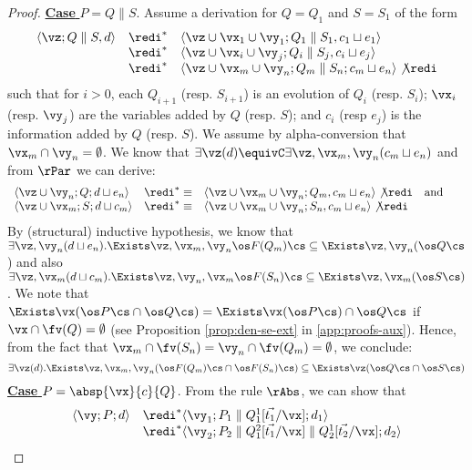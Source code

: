 \documentclass{tlp}
\begin{document}
\begin{proof}
	
\noindent \underline{{\bf Case}  $P=Q \parallel S$}.   Assume a derivation for $Q=Q_1$ and $S=S_1$ of the form
	\[
	\begin{array}{lll}
	\langle \vz ;Q\parallel S,d \rangle &\redi^*& 
	\langle \vz \cup \vx_1\cup\vy_1;Q_1\parallel S_1, c_1 \sqcup e_1 \rangle \\
	&\redi^*& \langle \vz \cup  \vx_i \cup \vy_j; Q_i \parallel S_j , c_i \sqcup e_j\rangle \\
	&\redi^*& \langle \vz \cup  \vx_m\cup\vy_n; Q_m\parallel S_n; c_m \sqcup e_n \rangle \not\redi
	\end{array}
	\]
	such that for $i > 0$, each $Q_{i+1}$ (resp. $S_{i+1}$) is an evolution of $Q_i$ (resp.  $S_i$);
	$\vx_i$ (resp. $\vy_j$) are the variables added by $Q$ (resp. $S$); and $c_{i}$ (resp $e_{j}$)
	is the information added by $Q$ (resp. $S$). We assume by alpha-conversion that $\vx_m \cap \vy_n = \emptyset$. 
	We know that  $\exists \vz(d) \equivC  \exists \vz,\vx_m,\vy_n(c_m \sqcup e_n) $ and from $\rPar$ we can derive:
	\[
	\begin{array}{lll}
	\langle \vz\cup\vy_n; Q ;d\sqcup e_n \rangle &\redi^*\equiv&
  \langle \vz\cup   \vx_{m}\cup\vy_n;Q_m,c_m \sqcup  e_n\rangle \not\redi
	\mbox{\ \ \ and \ \ \ } \\
	\langle \vz\cup \vx_m; S ;d\sqcup c_m \rangle &\redi^*\equiv&
  \langle \vz\cup   \vx_{m}\cup\vy_n;S_n,c_m \sqcup  e_n\rangle \not\redi
	\end{array}
	\]
	By (structural) inductive hypothesis, we know that  $\exists \vz,\vy_n (d\sqcup e_n).\Exists \vz,\vx_m,\vy_n \os F(Q_m)\cs \subseteq \Exists \vz,\vy_n(\os Q\cs$) and also   $\exists \vz,\vx_m(d\sqcup c_m).\Exists \vz,\vy_n,\vx_m \os F(S_n)\cs \subseteq \Exists \vz,\vx_m(\os S\cs)$. We note that  $\Exists \vx( \os P \cs \cap \os Q\cs) = \Exists \vx(\os P\cs) \cap \os Q \cs$ if $\vx\cap\fv(Q) = \emptyset$ (see Proposition \ref{prop:den-se-ext} in \ref{app:proofs-aux}). Hence,  from the fact that   $\vx_m \cap   \fv(S_n) = \vy_n  \cap \fv(Q_m) = \emptyset$,  we conclude: 
	\[ 
	\exists \vz(d).\Exists \vz, \vx_m,\vy_n (\os F(Q_m)\cs \cap \os F(S_n)\cs) \subseteq \Exists \vz (\os Q\cs \cap \os S \cs)
	\] 
\noindent \underline{{\bf Case}  $P = \absp{\vx}{c}{Q}$}.   From the rule $\rAbs$, we can show that
\[
\begin{array}{ll}
\langle \vy; P ; d\rangle & \redi^*   \langle \vy_1;P_1 \parallel Q_1^1[\vec{t_1}/\vx] ; d_1\rangle \\
  & \redi^*   \langle \vy_2; P_2 \parallel Q_1^2[\vec{t_1}/\vx] \parallel Q_2^1[\vec{t_2}/\vx] ; d_2 \rangle \\

\end{array}\]
\end{proof}
\end{document}

